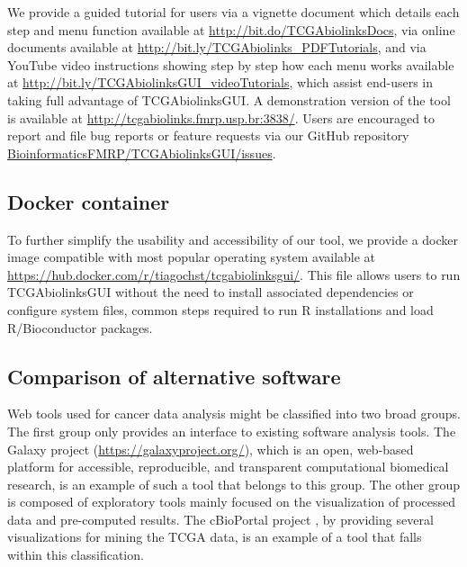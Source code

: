 We provide a guided tutorial for users via a vignette document which details each step and menu function available at \href{http://bit.do/TCGAbiolinksDocs}{http://bit.do/TCGAbiolinksDocs}, via online documents available at
\href{http://bit.ly/TCGAbiolinks\_PDFTutorials}{http://bit.ly/TCGAbiolinks\_PDFTutorials}, and via YouTube video instructions showing step by step how each menu works available at \href{http://bit.ly/TCGAbiolinksGUI\_videoTutorials}{http://bit.ly/TCGAbiolinksGUI\_videoTutorials}, which assist end-users in taking full advantage of TCGAbiolinksGUI. A demonstration version of the tool is available at \href{http://tcgabiolinks.fmrp.usp.br:3838/}{http://tcgabiolinks.fmrp.usp.br:3838/}. Users are encouraged to report and file bug reports or feature requests via our GitHub repository \href{https://github.com/BioinformaticsFMRP/TCGAbiolinksGUI/issues}{BioinformaticsFMRP/TCGAbiolinksGUI/issues}.

\subsection{Docker container}
To further simplify the usability and accessibility of our tool, we provide a docker image compatible with most popular operating system available at \\
\href{https://hub.docker.com/r/tiagochst/tcgabiolinksgui/}{https://hub.docker.com/r/tiagochst/tcgabiolinksgui/}. This file allows users to run TCGAbiolinksGUI without the need to install associated dependencies or configure system files, common steps required to run R installations and load R/Bioconductor packages.

\subsection{Comparison of alternative software}

Web tools used for cancer data analysis might be classified into two broad groups.
The first group only provides an interface to existing software analysis tools.
The Galaxy project (\href{https://galaxyproject.org/}{https://galaxyproject.org/}), which is an open, web-based platform for accessible, reproducible, and transparent computational biomedical research, is an example of such a tool that belongs to this group.
The other group is composed of exploratory tools mainly focused on the visualization of processed data and pre-computed results. The cBioPortal project \cite{gao2013integrative,cerami2012cbio}, by providing several visualizations for mining the TCGA data, is an example of a tool that falls within this classification.

